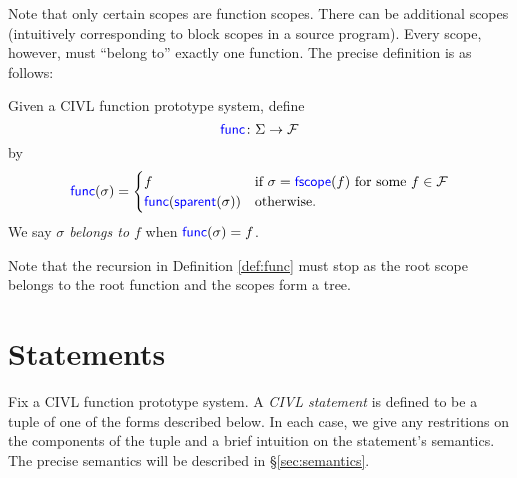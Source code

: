 Note that only certain scopes are function scopes.  There can be
additional scopes (intuitively corresponding to block scopes in a
source program).  Every scope, however, must ``belong to'' exactly one
function.  The precise definition is as follows:
\begin{definition}
  \label{def:func}
  Given a CIVL function prototype system, define
  \[
  \textup{\textsf{\textcolor{blue}{func}}} \colon \Sigma \rightarrow \mathcal{F} 
  \]
  by
  \[
  \textup{\textsf{\textcolor{blue}{func}}}(\sigma)=
  \begin{cases}
    f & \text{if $\sigma=\textup{\textsf{\textcolor{blue}{fscope}}}(f)$ for some $f\in\mathcal{F}$}\\
    \textup{\textsf{\textcolor{blue}{func}}}(\textup{\textsf{\textcolor{blue}{sparent}}}(\sigma)) & \text{otherwise.}
  \end{cases}
  \]
  We say \emph{$\sigma$ belongs to $f$}  when $\textup{\textsf{\textcolor{blue}{func}}}(\sigma)=f$.
\end{definition}
Note that the recursion in Definition \ref{def:func} must stop as the
root scope belongs to the root function and the scopes form a tree.


\section{Statements}

Fix a CIVL function prototype system.  A \emph{CIVL statement} is
defined to be a tuple of one of the forms described below.
In each case, we give any restritions on the components of the tuple
and a brief intuition on the statement's semantics.  The precise
semantics will be described in \S\ref{sec:semantics}.

